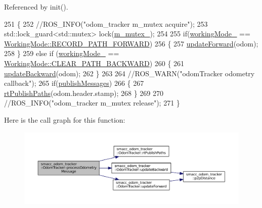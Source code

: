 Referenced by init().


\begin{DoxyCode}
251 \{
252     \textcolor{comment}{//ROS\_INFO("odom\_tracker m\_mutex acquire");}
253     std::lock\_guard<std::mutex> lock(\hyperlink{classsmacc__odom__tracker_1_1OdomTracker_ad65e52bfd236e073940808c35f2bed8c}{m\_mutex\_});
254 
255     \textcolor{keywordflow}{if}(\hyperlink{classsmacc__odom__tracker_1_1OdomTracker_ad011432ae35a533fd61bae43179c3c36}{workingMode\_} == \hyperlink{namespacesmacc__odom__tracker_ade9730dd5cc10ccfad9362176cf46c33a989d06a586bcf9520889228da7faa643}{WorkingMode::RECORD\_PATH\_FORWARD})
256     \{
257         \hyperlink{classsmacc__odom__tracker_1_1OdomTracker_a7ef4ecc171a6fd37b2ed3c96a58e0659}{updateForward}(odom);
258     \}       
259     \textcolor{keywordflow}{else} \textcolor{keywordflow}{if} (\hyperlink{classsmacc__odom__tracker_1_1OdomTracker_ad011432ae35a533fd61bae43179c3c36}{workingMode\_} == \hyperlink{namespacesmacc__odom__tracker_ade9730dd5cc10ccfad9362176cf46c33a0cf8f27617189e35619df3c18bda6274}{WorkingMode::CLEAR\_PATH\_BACKWARD})
260     \{
261         \hyperlink{classsmacc__odom__tracker_1_1OdomTracker_a3a47119be9af27de9115b043d1f76fe7}{updateBackward}(odom);
262     \}
263 
264     \textcolor{comment}{//ROS\_WARN("odomTracker odometry callback");}
265     \textcolor{keywordflow}{if}(\hyperlink{classsmacc__odom__tracker_1_1OdomTracker_a5aaa7b76cae6ed70524d0f2ac04cbe70}{publishMessages})
266     \{
267         \hyperlink{classsmacc__odom__tracker_1_1OdomTracker_a8c9144a9d8b9ede7f45d06492496564c}{rtPublishPaths}(odom.header.stamp);
268     \}
269 
270     \textcolor{comment}{//ROS\_INFO("odom\_tracker m\_mutex release");}
271 \}
\end{DoxyCode}


Here is the call graph for this function\+:
\nopagebreak
\begin{figure}[H]
\begin{center}
\leavevmode
\includegraphics[width=350pt]{classsmacc__odom__tracker_1_1OdomTracker_adef7b87ba453ca86886239d875344de1_cgraph}
\end{center}
\end{figure}




